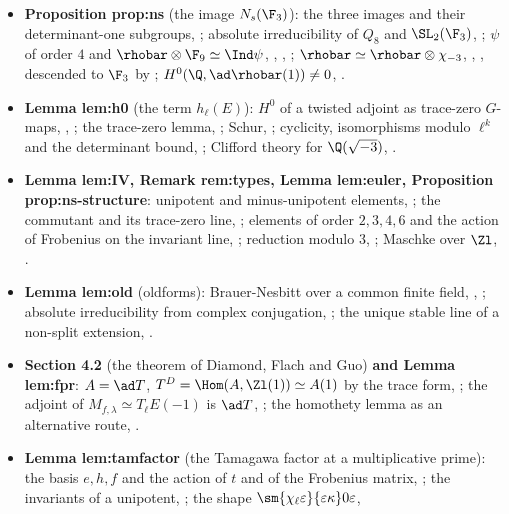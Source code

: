\begin{itemize}
\item \textbf{Proposition prop:ns} (the image $N_s(\F_3)$): the three images and their determinant-one subgroups, ;
absolute irreducibility of $Q_8$ and $\SL_2(\F_3)$, ; $\psi$ of order $4$ and $\rhobar\otimes\F_9\simeq\Ind\psi$,
, , ; $\rhobar\simeq\rhobar\otimes\chi_{-3}$, ,
, descended to $\F_3$ by ; $H^0(\Q,\ad\rhobar(1))\ne0$, .
\item \textbf{Lemma lem:h0} (the term $h_\ell(E)$): $H^0$ of a twisted adjoint as trace-zero $G$-maps, ,
; the trace-zero lemma, ; Schur, ; cyclicity, isomorphisms modulo
$\ell^k$ and the determinant bound, ; Clifford theory for $\Q(\sqrt{-3})$, .
\item \textbf{Lemma lem:IV, Remark rem:types, Lemma lem:euler, Proposition prop:ns-structure}: unipotent and minus-unipotent elements,
; the commutant and its trace-zero line, ; elements of order $2,3,4,6$ and the
action of Frobenius on the invariant line, ; reduction modulo $3$, ;
Maschke over $\Zl$, .
\item \textbf{Lemma lem:old} (oldforms): Brauer-Nesbitt over a common finite field, , ;
absolute irreducibility from complex conjugation, ; the unique stable line of a non-split extension,
.
\item \textbf{Section 4.2} (the theorem of Diamond, Flach and Guo) \textbf{and Lemma lem:fpr}: $A=\ad T$, $T^D=\Hom(A,\Zl(1))\simeq A(1)$ by the trace
form, ; the adjoint of $M_{f,\lambda}\simeq T_\ell E(-1)$ is $\ad T$, ; the homothety lemma
as an alternative route, .
\item \textbf{Lemma lem:tamfactor} (the Tamagawa factor at a multiplicative prime): the basis $e,h,f$ and the action of $t$ and of the Frobenius
matrix, ; the invariants of a unipotent, ; the shape $\sm{\chi_\ell\varepsilon}{\varepsilon\kappa}0\varepsilon$,

\end{itemize}
